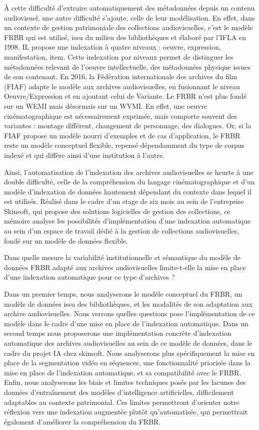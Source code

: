 	À cette difficulté d'extraire automatiquement des métadonnées depuis un contenu audiovisuel, une autre difficulté s'ajoute, celle de leur modélisation. En effet, dans un contexte de gestion patrimoniale des collections audiovisuelles, c'est le modèle FRBR qui est utilisé, issu du milieu des bibliothèques et élaboré par l'IFLA en 1998. IL propose une indexation à quatre niveaux : oeuvre, expression, manifestation, item. Cette indexation par niveaux permet de distinguer les métadonnées relevant de l'oeuvre intellectuelle, des métadonnées physique issues de son contenant. En 2016, la Fédération internationale des archives du film (FIAF) adapte le modèle aux archives audiovisuelles, en fusionnant le niveau Oeuvre/Expression et en ajoutant celui de Variante. Le FRBR n'est plus fondé sur un WEMI mais désormais sur un WVMI. En effet, une oeuvre cinématographique est nécessairement exprimée, mais comporte souvent des variantes : montage différent, changement de personnage, des dialogues. Or, si la FIAF propose un modèle nourri d'exemples et de cas d'application, le FRBR reste un modèle conceptuel flexible, repensé dépendamment du type de corpus indexé et qui diffère ainsi d'une institution à l'autre.
	
	Ainsi, l'automatisation de l'indexation des archives audiovisuelles se heurte à une double difficulté, celle de la compréhension du langage cinématographique et d'un modèle d'indexation de données hautement dépendant du contexte dans lequel il est utilisés. Réalisé dans le cadre d'un stage de six mois au sein de l'entreprise Skinsoft, qui propose des solutions logicielles de gestion des collections, ce mémoire analyse les possibilités d'implémentation d'une indexation automatique au sein d'un espace de travail dédié à la gestion de collections audiovisuelles, fondé sur un modèle de données flexible. 
	
	Dans quelle mesure la variabilité institutionnelle et sémantique du modèle de données FRBR adapté aux archives audiovisuelles limite-t-elle la mise en place d'une indexation automatique pour ce type d'archives ?
	
	Dans un premier temps, nous analyserons le modèle conceptuel du FRBR, un modèle de données issu des bibliothèques, et les modalités de son adaptation aux archive audiovisuelles. Nous verrons quelles questions pose l'implémentation de ce modèle dans le cadre d'une mise en place de l'indexation automatique. Dans un second temps nous proposerons une implémentation concrète d'indexation automatique des archives audiovisuelles au sein de ce modèle de données, dans le cadre du projet IA chez skinsoft. Nous analyserons plus spécifiquement la mise en place de la segmentation vidéo en séquences, une fonctionnalité priorisée dans la mise en place de l'indexation automatique, et sa compatibilité avec le FRBR. Enfin, nous analyserons les biais et limites techniques posés par les lacunes des données d'entraînement des modèles d'intelligence artificielles, difficilement adaptables au contexte patrimonial. Ces limites permettront d'orienter notre réflexion vers une indexation augmentée plutôt qu'automatisée, qui permettrait également d'améliorer la compréhension du FRBR.
	

